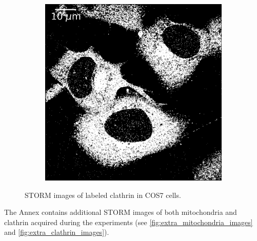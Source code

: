 \begin{figure}
\begin{subfigure}{0.49\textwidth}
        \includegraphics[width=\textwidth]{figures/clathrin_image2.png}
        \caption{}
        \label{fig:clathrin_image6}
    \end{subfigure}
    \caption{STORM images of labeled clathrin in COS7 cells.}
    \label{fig:clathrin_images}
\end{figure}

The Annex contains additional STORM images of both mitochondria and clathrin acquired during the experiments (see \autoref{fig:extra_mitochondria_images} and \autoref{fig:extra_clathrin_images}).